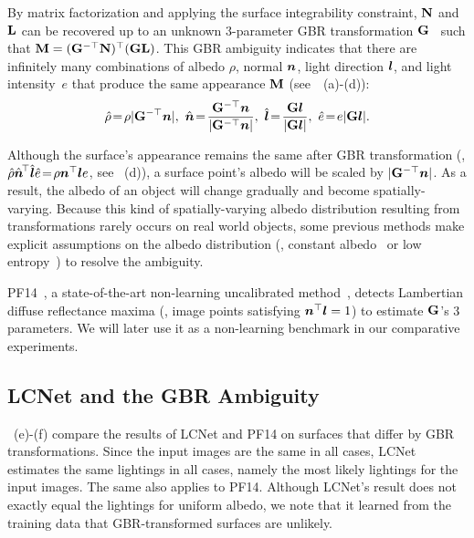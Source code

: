 By matrix factorization and applying the surface integrability constraint, $\mathbf{N}$ and $\mathbf{L}$ can be recovered up to an unknown $3$-parameter GBR transformation $\mathbf{G}$~\cite{belhumeur1999bas} such that \hbox{$\mathbf{M} = (\mathbf{G}^{-\top}\mathbf{N})^\top (\mathbf{G}\mathbf{L})$}. This GBR ambiguity indicates that there are infinitely many combinations of albedo $\rho$, normal $\boldsymbol{n}$, light direction $\boldsymbol{l}$, and light intensity~$e$ that produce the same appearance $\mathbf{M}$ (see~~(a)-(d)):
\begin{align}
    \hat{\rho} \!=\! \rho|\V{G}^{-\top}\vn|,\,\,
    \hat{\vn} \!=\! \frac{\V{G}^{-\top}\vn}{|\V{G}^{-\top}\vn|},\,\,
    \hat{\vl} \!=\! \frac{\V{G}\vl}{|\V{G}\vl|},\,\,
    \hat{e} \!=\! e |\V{G} \vl|.
\end{align}

Although the surface's appearance remains the same after GBR transformation (\ie, \hbox{$\hat{\rho} \hat{\boldsymbol{n}}^{\!\top} \hat{\boldsymbol{l}}  \hat{e} \!=\! \rho \boldsymbol{n}^\top \boldsymbol{l} e$}, see ~(d)), a surface point's albedo will be scaled by \hbox{$|\mathbf{G}^{-\top} \boldsymbol{n}|$}. As a result, the albedo of an object will change gradually and become spatially-varying. 
Because this
kind of spatially-varying albedo distribution resulting %
from \gbr transformations rarely occurs on real world objects, some previous methods make explicit assumptions on the albedo distribution (\eg, constant albedo~\cite{belhumeur1999bas,papad14closed} or low entropy~\cite{alldrin2007r}) to resolve the ambiguity.

PF14~\cite{papad14closed}, a state-of-the-art non-learning uncalibrated method~\cite{shi2019benchmark}, detects Lambertian diffuse reflectance maxima (\ie, image points satisfying $\boldsymbol{n}^\top\boldsymbol{l}=1$) to estimate $\mathbf{G}$'s $3$ parameters. %
We will later use it as a non-learning benchmark in our comparative experiments.


\subsection{LCNet and the GBR Ambiguity}
~(e)-(f) compare the results of LCNet and PF14 on surfaces that differ by GBR transformations. 
Since the input images are the same in all cases, LCNet estimates the same lightings in all cases, namely the most likely lightings for the input images. The same also applies to PF14.
Although LCNet's result does not exactly equal the lightings for uniform albedo, we note that it learned from the training data that GBR-transformed surfaces are unlikely.


